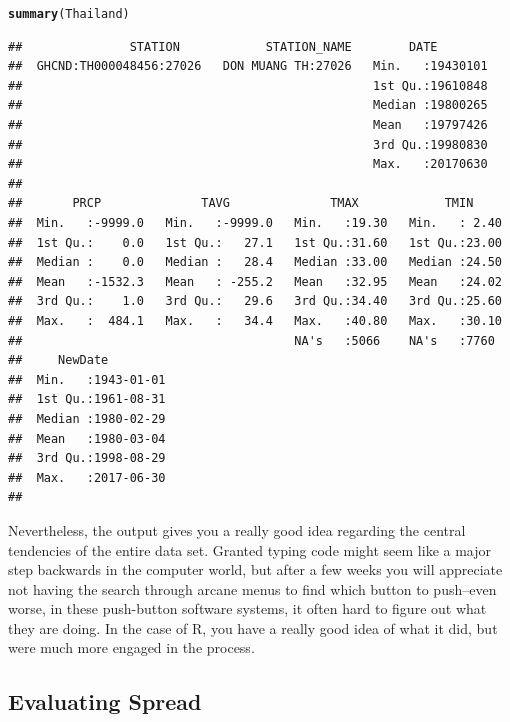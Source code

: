 \documentclass{article}\usepackage[]{graphicx}\usepackage[]{color}
\makeatletter
\newcommand{\hlstd}[1]{\textcolor[rgb]{0.345,0.345,0.345}{#1}}%
\newcommand{\hlkwd}[1]{\textcolor[rgb]{0.737,0.353,0.396}{\textbf{#1}}}%
\newenvironment{kframe}{%
 \def\at@end@of@kframe{}%
 \ifinner\ifhmode%
  \def\at@end@of@kframe{\end{minipage}}%
  \begin{minipage}{\columnwidth}%
 \fi\fi%
 \def\FrameCommand##1{\hskip\@totalleftmargin \hskip-\fboxsep
 \colorbox{shadecolor}{##1}\hskip-\fboxsep
     \hskip-\linewidth \hskip-\@totalleftmargin \hskip\columnwidth}%
 \MakeFramed {\advance\hsize-\width
   \@totalleftmargin\z@ \linewidth\hsize
   \@setminipage}}%
 {\par\unskip\endMakeFramed%
 \at@end@of@kframe}
\newenvironment{knitrout}{}{} %
\makeatother
\begin{document}
\begin{knitrout}
\color{fgcolor}\begin{kframe}
\begin{alltt}
\hlkwd{summary}\hlstd{(Thailand)}
\end{alltt}
\begin{verbatim}
##               STATION            STATION_NAME        DATE         
##  GHCND:TH000048456:27026   DON MUANG TH:27026   Min.   :19430101  
##                                                 1st Qu.:19610848  
##                                                 Median :19800265  
##                                                 Mean   :19797426  
##                                                 3rd Qu.:19980830  
##                                                 Max.   :20170630  
##                                                                   
##       PRCP              TAVG              TMAX            TMIN      
##  Min.   :-9999.0   Min.   :-9999.0   Min.   :19.30   Min.   : 2.40  
##  1st Qu.:    0.0   1st Qu.:   27.1   1st Qu.:31.60   1st Qu.:23.00  
##  Median :    0.0   Median :   28.4   Median :33.00   Median :24.50  
##  Mean   :-1532.3   Mean   : -255.2   Mean   :32.95   Mean   :24.02  
##  3rd Qu.:    1.0   3rd Qu.:   29.6   3rd Qu.:34.40   3rd Qu.:25.60  
##  Max.   :  484.1   Max.   :   34.4   Max.   :40.80   Max.   :30.10  
##                                      NA's   :5066    NA's   :7760   
##     NewDate          
##  Min.   :1943-01-01  
##  1st Qu.:1961-08-31  
##  Median :1980-02-29  
##  Mean   :1980-03-04  
##  3rd Qu.:1998-08-29  
##  Max.   :2017-06-30  
## 
\end{verbatim}
\end{kframe}
\end{knitrout}



Nevertheless, the output gives you a really good idea regarding the central tendencies of the entire data set.  Granted typing code might seem like a major step backwards in the computer world, but after a few weeks you will appreciate not having the search through arcane menus to find which button to push--even worse, in these push-button software systems, it often hard to figure out what they are doing. In the case of R, you have a really good idea of what it did, but were much more engaged in the process.

\subsection{Evaluating Spread}
\end{document}
